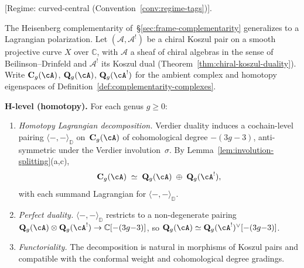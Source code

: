 \begin{theorem}
\label{thm:quantum-complementarity-main}
\label{thm:quantum-complementarity}
\textup{[}Regime: curved-central
\textup{(}Convention~\textup{\ref{conv:regime-tags})].}

\smallskip\noindent
The Heisenberg complementarity of~\S\ref{sec:frame-complementarity} generalizes to a Lagrangian polarization.
Let $(\mathcal{A}, \mathcal{A}^!)$ be a chiral Koszul pair on a smooth projective
curve $X$ over $\mathbb{C}$, with $\mathcal{A}$ a sheaf of chiral algebras in
the sense of Beilinson--Drinfeld \cite[Chapter 3]{BD04} and $\mathcal{A}^!$
its Koszul dual (Theorem~\ref{thm:chiral-koszul-duality}).
Write $\mathbf{C}_g(\cA)$, $\mathbf{Q}_g(\cA)$, $\mathbf{Q}_g(\cA^!)$
for the ambient complex and homotopy eigenspaces of
Definition~\textup{\ref{def:complementarity-complexes}}.

\smallskip\noindent
\textbf{H-level \textup{(}homotopy\textup{)}.}
For each genus $g \geq 0$:
\begin{enumerate}[label=\textup{(\roman*)}]
\item \emph{Homotopy Lagrangian decomposition.}
  Verdier duality induces a cochain-level pairing
  $\langle -,- \rangle_{\mathbb{D}}$ on~$\mathbf{C}_g(\cA)$
  of cohomological degree $-(3g{-}3)$, anti-symmetric under the
  Verdier involution~$\sigma$.
  By Lemma~\textup{\ref{lem:involution-splitting}(a,c)},
  \begin{equation}\label{eq:complementarity-decomp}
  \mathbf{C}_g(\cA) \;\simeq\;
  \mathbf{Q}_g(\cA) \;\oplus\; \mathbf{Q}_g(\cA^!),
  \end{equation}
  with each summand Lagrangian for
  $\langle -,- \rangle_{\mathbb{D}}$.

\item \emph{Perfect duality.}
  $\langle -, - \rangle_{\mathbb{D}}$ restricts to a
  non-degenerate pairing
  $\mathbf{Q}_g(\cA) \otimes \mathbf{Q}_g(\cA^!) \to \mathbb{C}[-{(3g{-}3)}]$,
  so $\mathbf{Q}_g(\cA) \simeq \mathbf{Q}_g(\cA^!)^\vee[-(3g{-}3)]$.

\item \emph{Functoriality.}
  The decomposition is natural in morphisms of Koszul pairs
  and compatible with the conformal weight and
  cohomological degree gradings.
\end{enumerate}


\end{theorem}
